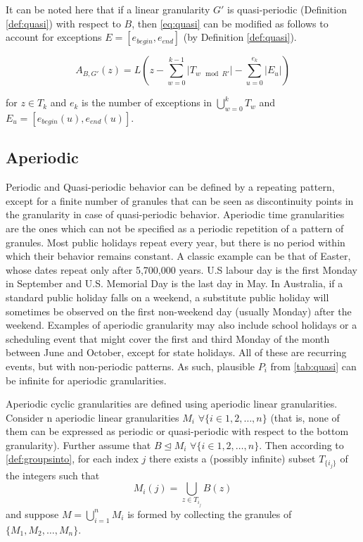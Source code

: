 \documentclass[12pt]{article}
\begin{document}
It can be noted here that if a linear granularity \(G'\) is quasi-periodic (Definition \autoref{def:quasi}) with respect to \(B\), then \autoref{eq:quasi} can be modified as follows to account for exceptions \(E = [e_{begin}, e_{end}]\) (by Definition \autoref{def:quasi}).

\begin{equation}\label{eq6}
A_{B, G'}(z) = L(z - \sum_{w=0}^{k-1}\vert T_{w \mod R'} \vert - \sum_{u=0}^{e_k}\vert E_{u} \vert)
\end{equation}

for \(z \in T_k\) and \(e_k\) is the number of exceptions in \(\bigcup\limits_{w = 0}^{k} T_w\) and \(E_{u} = [e_{begin}(u), e_{end}(u)]\).

\hypertarget{sec:aperiodic-gran-def}{%
\subsection{Aperiodic}\label{sec:aperiodic-gran-def}}

Periodic and Quasi-periodic behavior can be defined by a repeating pattern, except for a finite number of granules that can be seen as discontinuity points in the granularity in case of quasi-periodic behavior. Aperiodic time granularities are the ones which can not be specified as a periodic repetition of a pattern of granules. Most public holidays repeat every year, but there is no period within which their behavior remains constant. A classic example can be that of Easter, whose dates repeat only after 5,700,000 years. U.S labour day is the first Monday in September and U.S. Memorial Day is the last day in May. In Australia, if a standard public holiday falls on a weekend, a substitute public holiday will sometimes be observed on the first non-weekend day (usually Monday) after the weekend. Examples of aperiodic granularity may also include school holidays or a scheduling event that might cover the first and third Monday of the month between June and October, except for state holidays. All of these are recurring events, but with non-periodic patterns. As such, plausible \(P_i\) from \autoref{tab:quasi} can be infinite for aperiodic granularities.

Aperiodic cyclic granularities are defined using aperiodic linear granularities. Consider n aperiodic linear granularities \(M_i\) \(\forall \{i\in{1, 2, \dots, n\}}\) (that is, none of them can be expressed as periodic or quasi-periodic with respect to the bottom granularity). Further assume that \(B \trianglelefteq M_i\) \(\forall \{i\in{1, 2, \dots, n\}}\). Then according to \autoref{def:groupsinto}, for each index \(j\) there exists a (possibly infinite) subset \(T_{\{i_j\}}\) of the integers such that
\begin{equation*}
M_{i}(j) = \bigcup_{z \in T_{i_j}}B(z)
\end{equation*}
and suppose \(M = \bigcup_{i=1}^{n}M_{i}\) is formed by collecting the granules of \(\{M_1, M_2, \dots, M_n\}\).
\end{document}
